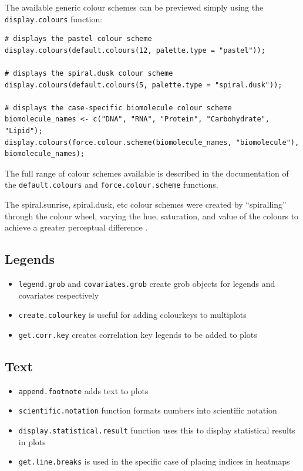 \documentclass[letterpaper]{article}
\begin{document}
The available generic colour schemes can be previewed simply using the \verb|display.colours| function:
\begin{verbatim}
# displays the pastel colour scheme
display.colours(default.colours(12, palette.type = "pastel"));

# displays the spiral.dusk colour scheme
display.colours(default.colours(5, palette.type = "spiral.dusk"));

# displays the case-specific biomolecule colour scheme
biomolecule_names <- c("DNA", "RNA", "Protein", "Carbohydrate", "Lipid");
display.colours(force.colour.scheme(biomolecule_names, "biomolecule"), biomolecule_names);
\end{verbatim}

The full range of colour schemes available is described in the documentation of the \verb|default.colours| and \verb|force.colour.scheme| functions.

The spiral.sunrise, spiral.dusk, etc colour schemes were created by ``spiralling'' through the colour wheel, varying the hue, saturation, and value of the colours to achieve a greater perceptual difference \cite{rainbow} \cite{wong2}. 

\subsection{Legends}
\begin{itemize}
\item \texttt{legend.grob} and \texttt{covariates.grob} create grob objects for legends and covariates respectively
\item \texttt{create.colourkey} is useful for adding colourkeys to multiplots
\item \texttt{get.corr.key} creates correlation key legends to be added to plots
\end{itemize}

\subsection{Text}
\begin{itemize}
\item \texttt{append.footnote} adds text to plots
\item \texttt{scientific.notation} function formats numbers into scientific notation
\item \texttt{display.statistical.result} function uses this to display statistical results in plots
\item \texttt{get.line.breaks} is used in the specific case of placing indices in heatmaps
\end{itemize}
\end{document}
